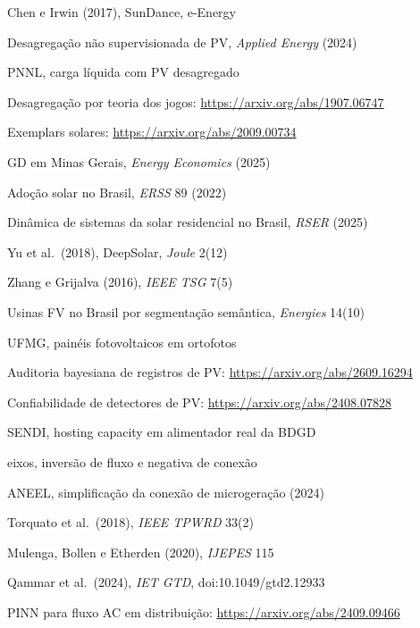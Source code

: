 {\begin{enumerate}[label={[\arabic*]},leftmargin=2.2em,itemsep=1pt]
\item Chen e Irwin (2017), SunDance, e-Energy
\item Desagregação não supervisionada de PV, \emph{Applied Energy} (2024)
\item PNNL, carga líquida com PV desagregado
\item Desagregação por teoria dos jogos: \url{https://arxiv.org/abs/1907.06747}
\item Exemplars solares: \url{https://arxiv.org/abs/2009.00734}
\item GD em Minas Gerais, \emph{Energy Economics} (2025)
\item Adoção solar no Brasil, \emph{ERSS} 89 (2022)
\item Dinâmica de sistemas da solar residencial no Brasil, \emph{RSER} (2025)
\item Yu et al.\ (2018), DeepSolar, \emph{Joule} 2(12)
\item Zhang e Grijalva (2016), \emph{IEEE TSG} 7(5)
\item Usinas FV no Brasil por segmentação semântica, \emph{Energies} 14(10)
\item UFMG, painéis fotovoltaicos em ortofotos
\item Auditoria bayesiana de registros de PV: \url{https://arxiv.org/abs/2609.16294}
\item Confiabilidade de detectores de PV: \url{https://arxiv.org/abs/2408.07828}
\item SENDI, hosting capacity em alimentador real da BDGD
\item eixos, inversão de fluxo e negativa de conexão
\item ANEEL, simplificação da conexão de microgeração (2024)
\item Torquato et al.\ (2018), \emph{IEEE TPWRD} 33(2)
\item Mulenga, Bollen e Etherden (2020), \emph{IJEPES} 115
\item Qammar et al.\ (2024), \emph{IET GTD}, doi:10.1049/gtd2.12933
\item PINN para fluxo AC em distribuição: \url{https://arxiv.org/abs/2409.09466}
\end{enumerate}}
